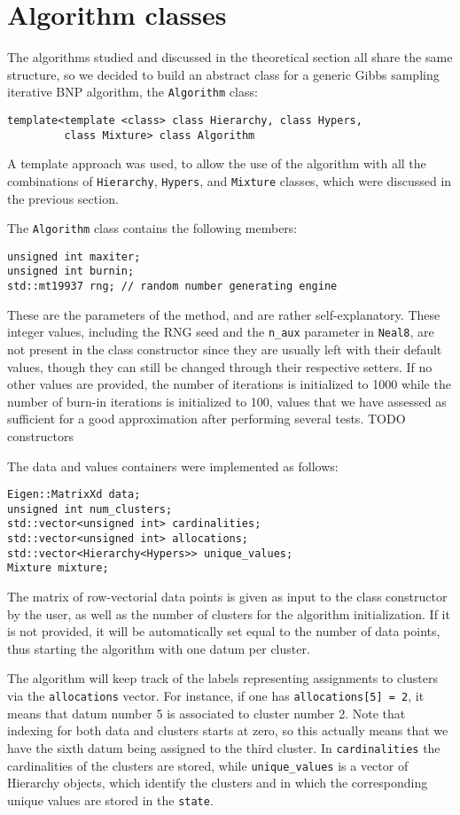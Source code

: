 \section{Algorithm classes}

The algorithms studied and discussed in the theoretical section all share the same structure, so we decided to build an abstract class for a generic Gibbs sampling iterative BNP algorithm, the \verb|Algorithm| class:
\begin{verbatim}
template<template <class> class Hierarchy, class Hypers,
         class Mixture> class Algorithm
\end{verbatim}
A template approach was used, to allow the use of the algorithm with all the combinations of \verb|Hierarchy|, \verb|Hypers|, and \verb|Mixture| classes, which were discussed in the previous section.

The \verb|Algorithm| class contains the following members:
\begin{verbatim}
unsigned int maxiter;
unsigned int burnin;
std::mt19937 rng; // random number generating engine
\end{verbatim}
These are the parameters of the method, and are rather self-explanatory.
These integer values, including the RNG seed and the \verb|n_aux| parameter in \verb|Neal8|, are not present in the class constructor since they are usually left with their default values, though they can still be changed through their respective setters.
If no other values are provided, the number of iterations is initialized to 1000 while the number of burn-in iterations is initialized to 100, values that we have assessed as sufficient for a good approximation after performing several tests.
TODO constructors

The data and values containers were implemented as follows:
\begin{verbatim}
Eigen::MatrixXd data;
unsigned int num_clusters;
std::vector<unsigned int> cardinalities;
std::vector<unsigned int> allocations;
std::vector<Hierarchy<Hypers>> unique_values;
Mixture mixture;
\end{verbatim}

The matrix of row-vectorial data points is given as input to the class constructor by the user, as well as the number of clusters for the algorithm initialization. If it is not provided, it will be automatically set equal to the number of data points, thus starting the algorithm with one datum per cluster.

The algorithm will keep track of the labels representing assignments to clusters via the \verb|allocations| vector.
For instance, if one has \verb|allocations[5] = 2|, it means that datum number 5 is associated to cluster number 2.
Note that indexing for both data and clusters starts at zero, so this actually means that we have the sixth datum being assigned to the third cluster. 
In \verb|cardinalities| the cardinalities of the clusters are stored, while \verb|unique_values| is a vector of Hierarchy objects, which identify the clusters and in which the corresponding unique values are stored in the \verb|state|.


